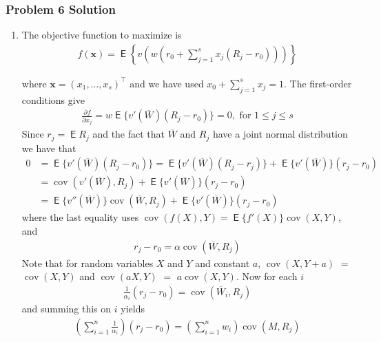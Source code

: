 \documentclass[10pt,handout]{beamer}
\newcommand{\ds}{\displaystyle}
\DeclareMathOperator\expc{\mathsf{E}}
\DeclareMathOperator\cov{cov}
\theoremstyle{definition}
\begin{document}
\begin{frame}[allowframebreaks]
  \frametitle{Problem 6 Solution}
  \begin{enumerate}
    \item The objective function to maximize is \vspace{-2mm}
      \begin{align*}
        f(\mathbf{x}) = \expc\left\{v\left(w\left(r_0 + \sum_{j=1}^s x_j(R_j - r_0)\right)\right)\right\}
      \end{align*}
      \vspace{-4mm}

      where $\mathbf{x} = (x_1,\ldots,x_s)^\top$ and we have used $\ds x_0 + \sum_{j=1}^s x_j = 1$. The first-order conditions give 
      \begin{align*}
        \frac{\partial f}{\partial x_j} = w\expc\big\{v'(\overline{W})(R_j - r_0)\big\} = 0, \text{ for } 1 \leqslant j \leqslant s
      \end{align*}
      Since $r_j = \expc{R_j}$ and the fact that $\overline{W}$ and $R_j$ have a joint normal distribution we have that
      \begin{align*}
        0 &= \expc\big\{v'(\overline{W})(R_j - r_0)\big\} = \expc\big\{v'(\overline{W})(R_j - r_j)\big\} + \expc\big\{v'(\overline{W})\big\}(r_j - r_0) \\
          &= \cov(v'(\overline{W}), R_j) + \expc\big\{v'(\overline{W})\big\}(r_j - r_0) \\
          &= \expc\big\{v''(\overline{W})\big\}\cov(\overline{W}, R_j) + \expc\big\{v'(\overline{W})\big\}(r_j - r_0)
        \end{align*}
        where the last equality uses $\ds\cov(f(X), Y) = \expc\big\{f'(X)\big\}\cov(X, Y)$, and 
      \begin{align*}
        r_j - r_0 = \alpha \cov(\overline{W}, R_j)
      \end{align*}
      Note that for random variables $X$ and $Y$ and constant $a$, $\cov(X, Y + a)$ $=$ $\cov(X, Y)$ and $\cov(aX, Y)$ $=$ $a\cov(X,Y)$. Now for each $i$
      \begin{align*}
        \frac{1}{\alpha_i}(r_j - r_0) = \cov(\overline{W}_i, R_j)
      \end{align*}
      and summing this on $i$ yields
      \begin{align*}
        \left(\sum_{i=1}^n\frac{1}{\alpha_i}\right)(r_j - r_0) = \left(\sum_{i=1}^n w_i\right)\cov(M, R_j)
      \end{align*}
      \vspace{-4mm}


\end{enumerate}
\end{frame}
\end{document}
